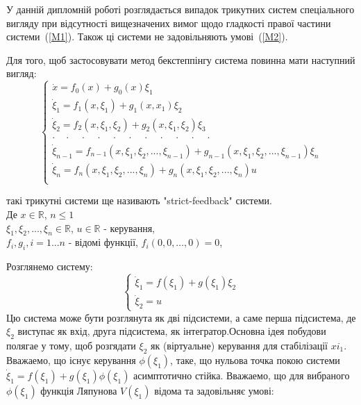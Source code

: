 \documentclass{article}
\begin{document}
У данній дипломній роботі розглядається випадок трикутних систем спеціального вигляду при відсутності вищезначених вимог
щодо гладкості правої  частини системи~(\ref{M1}). Також ці системи не задовільняють умові~(\ref{M2}).
\pagebreak




Для того, щоб застосовувати метод бекстеппінгу система повинна мати наступний вигляд:
\begin{equation}
    \begin{cases}
        \dot x           = f_0(x)+g_0(x)\xi_1\\
        \dot \xi_1       = f_1(x, \xi_1)+g_{1}(x, x_1)\xi_2 \\
        \dot \xi_2       = f_2(x, \xi_1, \xi_2) + g_2(x, \xi_1, \xi_2)\xi_3 \\
       \cdot \quad \cdot \quad \cdot \quad \cdot  \quad \cdot  \quad \cdot
        \quad \cdot  \quad \cdot  \quad \cdot  \quad \cdot  \quad \cdot\\

       \dot \xi_{n-1}   = f_{n-1}(x, \xi_1, \xi_2, ... ,\xi_{n-1}) 
        +g_{n-1}(x, \xi_1, \xi_2, ... ,\xi_{n-1}) \xi_n\\
        \dot \xi_{n}     = f_{n}(x, \xi_1, \xi_2, ... ,\xi_{n}) 
        +g_{n}(x, \xi_1, \xi_2, ... ,\xi_{n})u\\

	\end{cases}
\end{equation}

такі трикутні системи ще називають "strict-feedback" системи.\\
Де $x \in \mathbb{R}$, $n \leq 1$\\
$\xi_1, \xi_2, ... ,\xi_n \in \mathbb{R}$, $u \in \mathbb{R}$ - керування,\\ 
$f_i, g_i, i = 1 ... n $ -  відомі функції, $f_i(0,0, \dots, 0) = 0$, 
\pagebreak








Розглянемо систему:
\begin{equation}
	\begin{cases}
		\dot \xi_1 = f(\xi_1) + g(\xi_1)\xi_2 \\
		\dot\xi_2 = u
	\end{cases}
\end{equation}
Цю система може бути розглянута як дві підсистеми, а саме перша підсистема, де $\xi_2$ виступає як вхід, друга
підсистема, як інтегратор.Основна ідея побудови полягае у тому, щоб розгядати $\xi_2$ як (віртуальне) керування для
стабілізації $xi_1$. Вважаемо, що існує керування $\phi(\xi_1)$, таке, що нульова точка покою
системи $\dot \xi_1 = f(\xi_1) + g(\xi_1)\phi(\xi_1)$
асимптотично стійка.
Вважаемо, що для вибраного $\phi(\xi_1)$ функція Ляпунова $V(\xi_1)$  відома та задовільняє умові:
\end{document}
